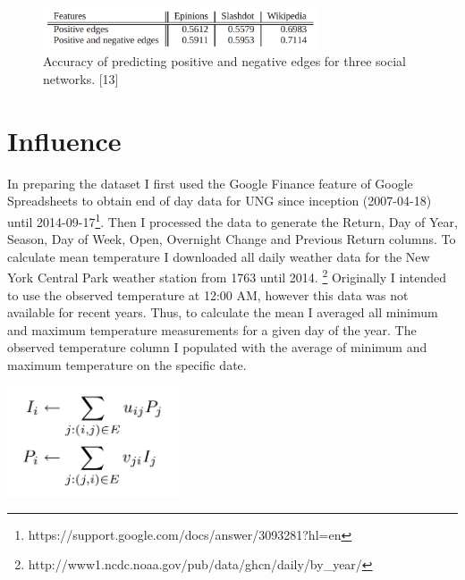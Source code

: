 \documentclass[conference,letterpaper]{IEEEtran}
\begin{document}
\begin{center}
\begin{figure}[hb]
\centering
\includegraphics[width=3.2in]{predicting_positive}
\caption{
Accuracy of predicting positive and negative edges for three social networks. [13]
}
\label{fig_sim}
\end{figure}
\end{center}


\section{Influence}
In preparing the dataset I first used the Google Finance feature of Google Spreadsheets to obtain end of day data for UNG
since inception (2007-04-18) until 2014-09-17\footnote{https://support.google.com/docs/answer/3093281?hl=en}. Then I processed 
the data to generate the Return, Day of Year, Season, Day of Week, Open, Overnight Change and Previous Return columns.
To calculate mean temperature I downloaded all daily weather data for the New York Central Park weather station from 1763 until 2014.
\footnote{http://www1.ncdc.noaa.gov/pub/data/ghcn/daily/by\_year/}
Originally I intended to use the observed temperature at 12:00 AM, however this data was not available for recent years.
Thus, to calculate the mean I averaged all minimum and maximum temperature measurements for a given day of the year. 
The observed temperature column I populated with the average of minimum and maximum temperature on the specific date. \\

\centerline{
  \includegraphics[width=2.0in]{influence_passivity.png}
}
\end{document}
